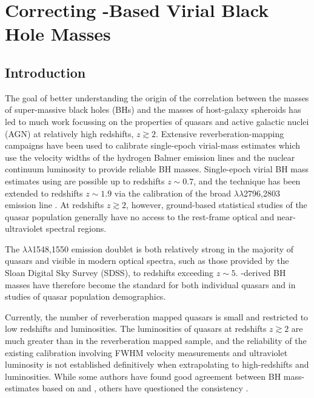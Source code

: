 
\chapter{Correcting -Based Virial Black Hole Masses}
\label{ch:bhmass}

\section{Introduction}

The goal of better understanding the origin of the correlation between the masses of super-massive black holes (BHs) and the masses of host-galaxy spheroids has led to much work focussing on the properties of quasars and active galactic nuclei (AGN) at relatively high redshifts, $z\gtrsim 2$. 
Extensive reverberation-mapping campaigns have been used to calibrate single-epoch virial-mass estimates which use the velocity widths of the hydrogen Balmer emission lines and the nuclear continuum luminosity to provide reliable BH masses.  
Single-epoch virial BH mass estimates using \hb are possible up to redshifts $z\sim0.7$, and the technique has been extended to redshifts $z\sim1.9$ via the calibration of the broad $\lambda\lambda$2796,2803 emission line \citep{mclure02,onken08,wang09,rafiee11}. 
At redshifts $z\gtrsim2$, however, ground-based statistical studies of the quasar population generally have no access to the rest-frame optical and near-ultraviolet spectral regions.

The $\lambda\lambda$1548,1550 emission doublet is both relatively strong in the majority of quasars and visible in modern optical spectra, such as those provided by the Sloan Digital Sky Survey (SDSS), to redshifts exceeding $z\sim5$. 
-derived BH masses have therefore become the standard \citep[e.g.][]{vestergaard06,park13} for both individual quasars and in studies of quasar population demographics.

Currently, the number of reverberation mapped quasars is small \citep[$\sim$50 quasars;][]{park13} and restricted to low redshifts and luminosities. 
The luminosities of quasars at redshifts $z\gtrsim 2$ are much greater than in the reverberation mapped sample, and the reliability of the existing calibration involving  FWHM velocity measurements and ultraviolet luminosity is not established definitively when extrapolating to high-redshifts and luminosities. 
While some authors have found good agreement between BH mass-estimates based on  and \hb \citep[e.g.][]{vestergaard06, assef11, tilton13}, others have questioned the consistency \citep[e.g.][]{baskin05,trakhtenbrot12,shen12}.

